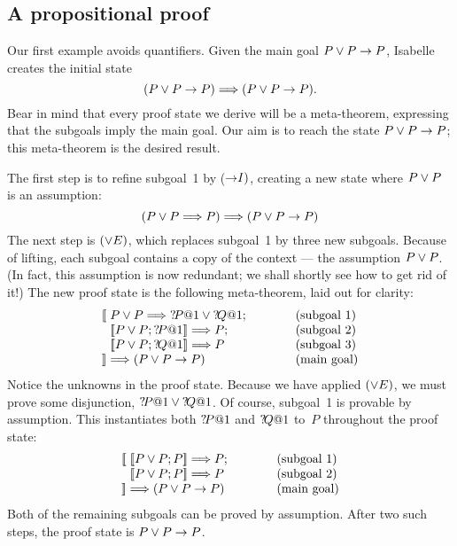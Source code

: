 \subsection{A propositional proof} \label{prop-proof}
Our first example avoids quantifiers. Given the main goal $P\vee P\rightarrow
P$, Isabelle creates the initial state
\[ (P\vee P\rightarrow P)\Longrightarrow (P\vee P\rightarrow P). \]
%
Bear in mind that every proof state we derive will be a meta-theorem,
expressing that the subgoals imply the main goal. Our aim is to reach the
state $P\vee P\rightarrow P$; this meta-theorem is the desired result.

The first step is to refine subgoal~1 by (${\rightarrow}I)$, creating a new state
where $P\vee P$ is an assumption:
\[ (P\vee P\Longrightarrow P)\Longrightarrow (P\vee P\rightarrow P) \]
The next step is $(\vee E)$, which replaces subgoal~1 by three new subgoals.
Because of lifting, each subgoal contains a copy of the context --- the
assumption $P\vee P$.  (In fact, this assumption is now redundant; we shall
shortly see how to get rid of it!)  The new proof state is the following
meta-theorem, laid out for clarity:
\[ \begin{array}{l@{}l@{\qquad\qquad}l}
       \lbrakk\;& P\disj P\Imp \Var{P@1}\disj\Var{Q@1}; & \hbox{(subgoal 1)} \\
       & \List{P\disj P; \Var{P@1}} \Imp P;    & \hbox{(subgoal 2)} \\
       & \List{P\disj P; \Var{Q@1}} \Imp P     & \hbox{(subgoal 3)} \\
       \rbrakk\;& \Imp (P\disj P\imp P)                 & \hbox{(main goal)}
\end{array}
\]
Notice the unknowns in the proof state. Because we have applied $(\vee E)$,
we must prove some disjunction, ${?\!P@1}\vee{?\!Q@1}$. Of course,
subgoal~1 is provable by assumption. This instantiates both ${?\!P@1}$ and
${?\!Q@1}$ to~$P$ throughout the proof state:
\[ \begin{array}{l@{}l@{\qquad\qquad}l}
       \lbrakk\;& \List{P\disj P; P} \Imp P; & \hbox{(subgoal 1)} \\
       & \List{P\disj P; P} \Imp P  & \hbox{(subgoal 2)} \\
       \rbrakk\;& \Imp (P\disj P\imp P)      & \hbox{(main goal)}
\end{array} \]
Both of the remaining subgoals can be proved by assumption. After two such
steps, the proof state is $P\vee P\rightarrow P$.

